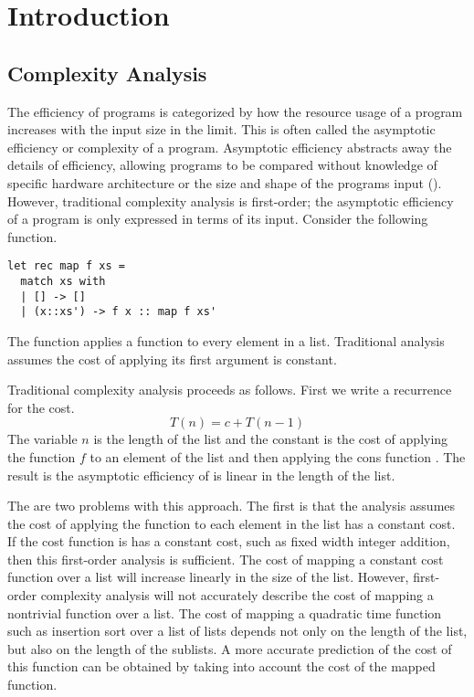 \chapter{Introduction}

\section{Complexity Analysis}

The efficiency of programs is categorized by how the resource usage of a
program increases with the input size in the limit.  This is often called the
asymptotic efficiency or complexity of a program.  Asymptotic efficiency
abstracts away the details of efficiency, allowing programs to be compared
without knowledge of specific hardware architecture or the size and shape of
the programs input (\citet{Cormen2001}).  However, traditional complexity
analysis is first-order; the asymptotic efficiency of a program is only
expressed in terms of its input.  Consider the following function.
%
\lstset{language=[Objective]Caml}
\begin{lstlisting}
let rec map f xs =
  match xs with
  | [] -> []
  | (x::xs') -> f x :: map f xs'
\end{lstlisting}
%
The function  applies a function to every element in a list.
Traditional analysis assumes the cost of applying its first argument is
constant.




Traditional complexity analysis proceeds as follows.  First we write a
recurrence for the cost.  \[ T(n) = c + T(n-1) \] The variable $n$ is the
length of the list and the constant  is the cost of applying the function
$f$ to an element of the list and then applying the cons function \T{::}. The
result is the asymptotic efficiency of  is linear in the length of the
list.



The are two problems with this approach.  The first is that the analysis
assumes the cost of applying the function  to each element in the list has
a constant cost. If the cost function is has a constant cost, such as fixed
width integer addition, then this first-order analysis is sufficient.  The cost
of mapping a constant cost function over a list will increase linearly in the
size of the list.  However, first-order complexity analysis will not accurately
describe the cost of mapping a nontrivial function over a list. The cost of
mapping a quadratic time function such as insertion sort over a list of lists
depends not only on the length of the list, but also on the length of the
sublists.  A more accurate prediction of the cost of this function can be
obtained by taking into account the cost of the mapped function.



